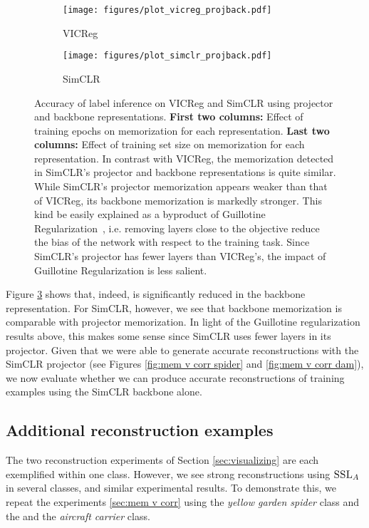 \begin{figure}[h]
     \centering
     \begin{subfigure}[b]{\textwidth}
         \centering
         \texttt{[image: figures/plot\_vicreg\_projback.pdf]}
         \caption{VICReg}
         \label{fig:vicreg v. epoch}
     \end{subfigure}
     \begin{subfigure}[b]{\textwidth}
         \centering
         \texttt{[image: figures/plot\_simclr\_projback.pdf]}
         \caption{SimCLR}
         \label{fig:vicreg lp v. epoch}
     \end{subfigure}
     \hfill
\caption[Accuracy of label inference on VICReg and SimCLR using projector and backbone representations.]{
Accuracy of label inference on VICReg and SimCLR using projector and backbone representations. \textbf{First two columns:} Effect of training epochs on memorization for each representation. \textbf{Last two columns:} Effect of training set size on memorization for each representation. In contrast with VICReg, the \dejavu memorization detected in SimCLR's projector and backbone representations is quite similar. While SimCLR's projector memorization appears weaker than that of VICReg, its backbone memorization is markedly stronger. This kind be easily explained as a byproduct of Guillotine Regularization~\citep{Guillotine}, i.e. removing layers close to the objective reduce the bias of the network with respect to the training task. Since SimCLR's projector has fewer layers than VICReg's, the impact of Guillotine Regularization is less salient.
}
\label{fig:proj v backbone}
\end{figure}

Figure \ref{fig:proj v backbone} shows that, indeed, \dejavu is significantly reduced in the backbone representation. For SimCLR, however, we see that backbone memorization is comparable with projector memorization. In light of the Guillotine regularization results above, this makes some sense since SimCLR uses fewer layers in its projector. Given that we were able to generate accurate reconstructions with the SimCLR projector (see Figures \ref{fig:mem v corr spider} and \ref{fig:mem v corr dam}), we now evaluate whether we can produce accurate reconstructions of training examples using the SimCLR backbone alone. 

\clearpage

\subsection{Additional reconstruction examples}
\label{sec:appx visualization}
The two reconstruction experiments of Section \ref{sec:visualizing} are each exemplified within one class. However, we see strong reconstructions using $\textsc{SSL}_A$ in several classes, and similar experimental results. To demonstrate this, we repeat the experiments \ref{sec:mem v corr} using the \emph{yellow garden spider} class and the and the \emph{aircraft carrier} class. 

